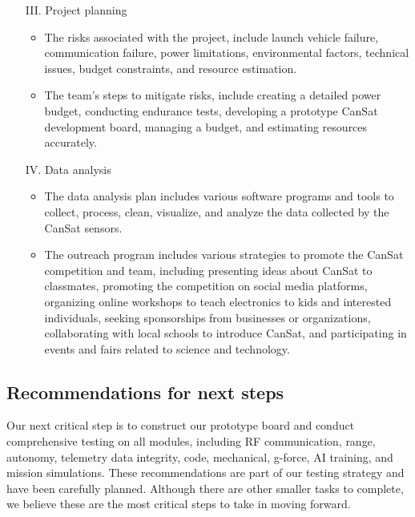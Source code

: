 \documentclass[11pt]{article}
\begin{document}
\begin{itemize}[leftmargin=1cm, itemindent=0.25cm, noitemsep, topsep=0pt, label=$\bullet$]
\begin{itemize}[label=$\bullet$, noitemsep, topsep=2pt]
\end{itemize}
\item[III.] Project planning
\begin{itemize}[label=$\bullet$, noitemsep, topsep=2pt]
\item The risks associated with the project, include launch vehicle failure, communication failure, power limitations, environmental factors, technical issues, budget constraints, and resource estimation.
\item The team's steps to mitigate risks, include creating a detailed power budget, conducting endurance tests, developing a prototype CanSat development board, managing a budget, and estimating resources accurately.
\end{itemize}
\item[IV.] Data analysis
\begin{itemize}[label=$\bullet$, noitemsep, topsep=2pt]
\item The data analysis plan includes various software programs and tools to collect, process, clean, visualize, and analyze the data collected by the CanSat sensors.
\item The outreach program includes various strategies to promote the CanSat competition and team, including presenting ideas about CanSat to classmates, promoting the competition on social media platforms, organizing online workshops to teach electronics to kids and interested individuals, seeking sponsorships from businesses or organizations, collaborating with local schools to introduce CanSat, and participating in events and fairs related to science and technology.
\end{itemize}
\end{itemize}

\subsection{Recommendations for next steps}
Our next critical step is to construct our prototype board and conduct comprehensive testing on all modules, including RF communication, range, autonomy, telemetry data integrity, code, mechanical, g-force, AI training, and mission simulations. These recommendations are part of our testing strategy and have been carefully planned. Although there are other smaller tasks to complete, we believe these are the most critical steps to take in moving forward.
\end{document}
